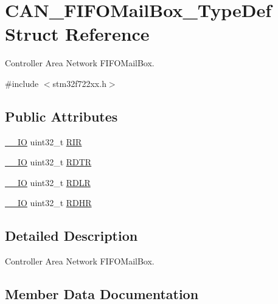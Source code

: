 \hypertarget{struct_c_a_n___f_i_f_o_mail_box___type_def}{}\section{C\+A\+N\+\_\+\+F\+I\+F\+O\+Mail\+Box\+\_\+\+Type\+Def Struct Reference}
\label{struct_c_a_n___f_i_f_o_mail_box___type_def}


Controller Area Network F\+I\+F\+O\+Mail\+Box.  




{\ttfamily \#include $<$stm32f722xx.\+h$>$}

\subsection*{Public Attributes}
\begin{DoxyCompactItemize}
\item 
\mbox{\hyperlink{core__sc300_8h_aec43007d9998a0a0e01faede4133d6be}{\+\_\+\+\_\+\+IO}} uint32\+\_\+t \mbox{\hyperlink{struct_c_a_n___f_i_f_o_mail_box___type_def_a034504d43f7b16b320745a25b3a8f12d}{R\+IR}}
\item 
\mbox{\hyperlink{core__sc300_8h_aec43007d9998a0a0e01faede4133d6be}{\+\_\+\+\_\+\+IO}} uint32\+\_\+t \mbox{\hyperlink{struct_c_a_n___f_i_f_o_mail_box___type_def_a49d74ca8b402c2b9596bfcbe4cd051a9}{R\+D\+TR}}
\item 
\mbox{\hyperlink{core__sc300_8h_aec43007d9998a0a0e01faede4133d6be}{\+\_\+\+\_\+\+IO}} uint32\+\_\+t \mbox{\hyperlink{struct_c_a_n___f_i_f_o_mail_box___type_def_ac7d62861de29d0b4fcf11fabbdbd76e7}{R\+D\+LR}}
\item 
\mbox{\hyperlink{core__sc300_8h_aec43007d9998a0a0e01faede4133d6be}{\+\_\+\+\_\+\+IO}} uint32\+\_\+t \mbox{\hyperlink{struct_c_a_n___f_i_f_o_mail_box___type_def_a95890984bd67845015d40e82fb091c93}{R\+D\+HR}}
\end{DoxyCompactItemize}


\subsection{Detailed Description}
Controller Area Network F\+I\+F\+O\+Mail\+Box. 

\subsection{Member Data Documentation}
\mbox{\label{struct_c_a_n___f_i_f_o_mail_box___type_def_a95890984bd67845015d40e82fb091c93}} 
